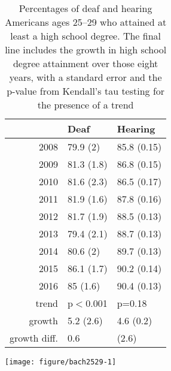 \documentclass{article}\usepackage[]{graphicx}\usepackage[]{color}
\makeatletter
\def\maxwidth{ %
  \ifdim\Gin@nat@width>\linewidth
    \linewidth
  \else
    \Gin@nat@width
  \fi
}
\newenvironment{knitrout}{}{} %
\makeatother
\begin{document}
\begin{table}[ht]
\centering
\begin{tabular}{rll}
  \hline
 & Deaf & Hearing \\
  \hline
2008 & 79.9 (2) & 85.8 (0.15) \\
  2009 & 81.3 (1.8) & 86.8 (0.15) \\
  2010 & 81.6 (2.3) & 86.5 (0.17) \\
  2011 & 81.9 (1.6) & 87.8 (0.16) \\
  2012 & 81.7 (1.9) & 88.5 (0.13) \\
  2013 & 79.4 (2.1) & 88.7 (0.13) \\
  2014 & 80.6 (2) & 89.7 (0.13) \\
  2015 & 86.1 (1.7) & 90.2 (0.14) \\
  2016 & 85 (1.6) & 90.4 (0.13) \\
  trend & p$<$0.001 & p=0.18 \\
  growth & 5.2 (2.6) & 4.6 (0.2) \\
  growth diff. & 0.6 & (2.6) \\
   \hline
\end{tabular}
\caption{Percentages of deaf and hearing Americans ages 25--29 who attained at least a high school degree. The final line includes the growth in high school degree attainment over those eight years, with a standard error and the p-value from Kendall's tau testing for the presence of a trend}
\end{table}


\begin{center}
\begin{knitrout}
\color{fgcolor}
\texttt{[image: figure/bach2529-1]}

\end{knitrout}
\end{center}
\end{document}

